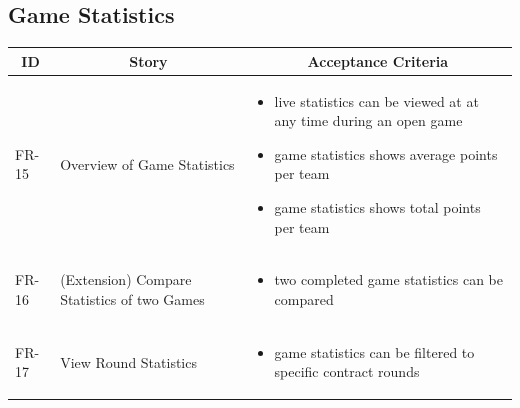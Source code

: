 \subsection{Game Statistics}
\begin{tabular} { | m{1.25cm} | m{5.75cm} | m{6cm} | }
    \hline
    \multicolumn{1}{|c|}{ \textbf{ID}} & \multicolumn{1}{|c|}{ \textbf{Story} } & \multicolumn{1}{|c|}{ \textbf{Acceptance Criteria} } \\
    \hline
    FR-15 & Overview of Game Statistics & \begin{itemize}[-]
        \item live statistics can be viewed at at any time during an open game
        \item game statistics shows average points per team
        \item game statistics shows total points per team
    \end{itemize}\\
    \hline
    FR-16 & (Extension) Compare Statistics of two Games & \begin{itemize}[-]
        \item two completed game statistics can be compared
    \end{itemize}\\
    \hline
    FR-17 & View Round Statistics & \begin{itemize}[-]
        \item game statistics can be filtered to specific contract rounds
    \end{itemize}\\
    \hline
\end{tabular}


